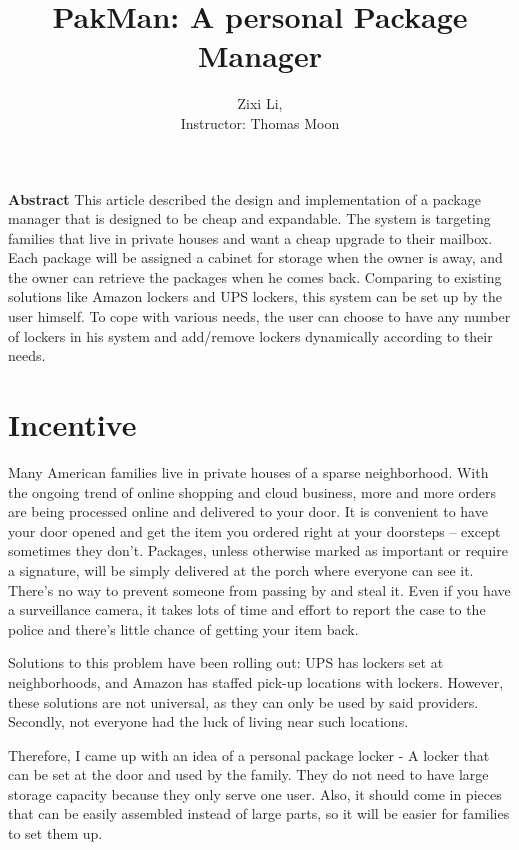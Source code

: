 \documentclass{article}
\title{PakMan: A personal Package Manager}
\author{Zixi Li,\\ Instructor: Thomas Moon}
\begin{document}
\maketitle
\par \textbf{Abstract} This article described the design and implementation of a package manager that is designed to be cheap and expandable. The system is targeting families that live in private houses and want a cheap upgrade to their mailbox. Each package will be assigned a cabinet for storage when the owner is away, and the owner can retrieve the packages when he comes back. Comparing to existing solutions like Amazon lockers and UPS lockers, this system can be set up by the user himself. To cope with various needs, the user can choose to have any number of lockers in his system and add/remove lockers dynamically according to their needs.
\newpage
\section{Incentive}
\par Many American families live in private houses of a sparse neighborhood. With the ongoing trend of online shopping and cloud business, more and more orders are being processed online and delivered to your door. It is convenient to have your door opened and get the item you ordered right at your doorsteps -- except sometimes they don't. Packages, unless otherwise marked as important or require a signature, will be simply delivered at the porch where everyone can see it. There's no way to prevent someone from passing by and steal it. Even if you have a surveillance camera, it takes lots of time and effort to report the case to the police and there's little chance of getting your item back.

\par Solutions to this problem have been rolling out: UPS has lockers set at neighborhoods, and Amazon has staffed pick-up locations with lockers. However, these solutions are not universal, as they can only be used by said providers. Secondly, not everyone had the luck of living near such locations.

\par Therefore, I came up with an idea of a personal package locker - A locker that can be set at the door and used by the family. They do not need to have large storage capacity because they only serve one user. Also, it should come in pieces that can be easily assembled instead of large parts, so it will be easier for families to set them up.
\end{document}
